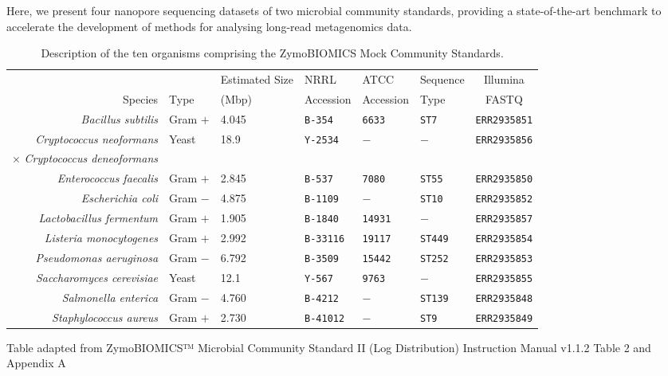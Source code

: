 \documentclass[a4paper,num-refs]{oup-contemporary}
\begin{document}
Here, we present four nanopore sequencing datasets of two microbial community standards, providing a state-of-the-art benchmark to accelerate the development of methods for analysing long-read metagenomics data.

\begin{table}[t!]
\centering
\caption{Description of the ten organisms comprising the ZymoBIOMICS Mock Community Standards.}
\label{tab:strains}
\begin{tabular}{r | l | l | l | l | l | c}
\toprule
 & & {Estimated Size} & NRRL & ATCC & Sequence & Illumina \\
 Species & Type & {(Mbp)} & Accession & Accession & Type &  FASTQ \\
\midrule
\textit{Bacillus subtilis}          & Gram $+$  & 4.045 & \texttt{B-354}   & \texttt{6633}& \texttt{ST7}   & \texttt{ERR2935851} \\
\textit{Cryptococcus neoformans}  & \multirow{2}{*}{Yeast} & \multirow{2}{*}{18.9} & \multirow{2}{*}{\texttt{Y-2534}}   & \multirow{2}{*}{$-$} & \multirow{2}{*}{$-$} & \multirow{2}{*}{\texttt{ERR2935856}} \\
$\times$ \textit{Cryptococcus deneoformans} & & & & & \\
\textit{Enterococcus faecalis}      & Gram $+$ & 2.845 & \texttt{B-537}   & \texttt{7080}& \texttt{ST55}  & \texttt{ERR2935850} \\
\textit{Escherichia coli}           & Gram $-$ & 4.875 & \texttt{B-1109}   & $-$& \texttt{ST10}  & \texttt{ERR2935852} \\
\textit{Lactobacillus fermentum}    & Gram $+$ & 1.905 & \texttt{B-1840}   & \texttt{14931}& $-$  & \texttt{ERR2935857} \\
\textit{Listeria monocytogenes}     & Gram $+$ & 2.992 & \texttt{B-33116}  & \texttt{19117}& \texttt{ST449}  & \texttt{ERR2935854} \\
\textit{Pseudomonas aeruginosa}     & Gram $-$ & 6.792 & \texttt{B-3509}   & \texttt{15442}& \texttt{ST252}  & \texttt{ERR2935853} \\
\textit{Saccharomyces cerevisiae}   & Yeast & 12.1 & \texttt{Y-567}    & \texttt{9763}& $-$  & \texttt{ERR2935855} \\
\textit{Salmonella enterica}        & Gram $-$ & 4.760 & \texttt{B-4212}    & $-$& \texttt{ST139} & \texttt{ERR2935848} \\
\textit{Staphylococcus aureus}      & Gram $+$ & 2.730 & \texttt{B-41012}  & $-$& \texttt{ST9}  & \texttt{ERR2935849} \\
\bottomrule
\end{tabular}
\begin{tablenotes}
\item Table adapted from ZymoBIOMICS™ Microbial Community Standard II (Log Distribution) Instruction Manual v1.1.2 Table 2 and Appendix A
\end{tablenotes}
\end{table}
\end{document}

